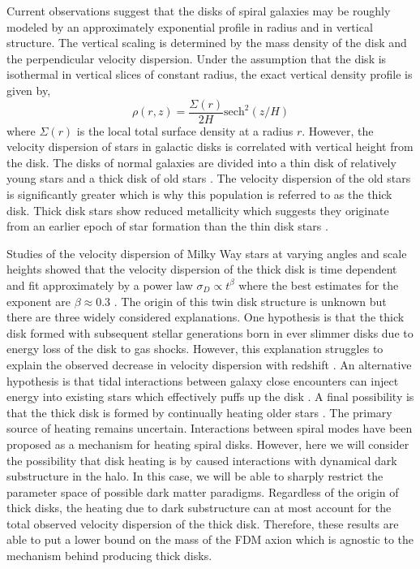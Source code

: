\documentclass[usenatbib]{mnras}
\begin{document}
\hspace{5mm} Current observations suggest that the disks of spiral galaxies may be roughly modeled by an approximately exponential profile in radius and in vertical structure. The vertical scaling is determined by the mass density of the disk and the perpendicular velocity dispersion. Under the assumption that the disk is isothermal in vertical slices of constant radius, the exact vertical density profile is given by,
\begin{equation}
\rho(r, z) =  \frac{\Sigma(r)}{2H} \mathrm{sech}^2{(z/H)} 
\end{equation} 
where $\Sigma(r)$ is the local total surface density at a radius $r$.
However, the velocity dispersion of stars in galactic disks is correlated with vertical height from the disk. The disks of normal galaxies are divided into a thin disk of relatively young stars and a thick disk of old stars \citep{binney_tremaine_2008}.  The velocity dispersion of the old stars is significantly greater which is why this population is referred to as the thick disk. Thick disk stars show reduced metallicity which suggests they originate from an earlier epoch of star formation than the thin disk stars \citep{binney_tremaine_2008}. 
\par
Studies of the velocity dispersion of Milky Way stars at varying angles and scale heights showed that the velocity dispersion of the thick disk is time dependent and fit approximately by a power law $\sigma_D \propto t^{\beta}$ where the best estimates for the exponent are $\beta \approx 0.3$ \citep{heating_history}. The origin of this twin disk structure is unknown but there are three widely considered explanations. One hypothesis is that the thick disk formed with subsequent stellar generations born in ever slimmer disks due to energy loss of the disk to gas shocks. However, this explanation struggles to explain the observed decrease in velocity dispersion with redshift \citep{emergence-thick-disk}. An alternative hypothesis is that tidal interactions between galaxy close encounters can inject energy into existing stars which effectively puffs up the disk \citep{thick-disk-mergers}. A final possibility is that the thick disk is formed by continually heating older stars \citep{thin-and-thick-disk}. The primary source of heating remains uncertain. Interactions between spiral modes have been proposed as a mechanism for heating spiral disks. However, here we will consider the possibility that disk heating is by caused interactions with dynamical dark substructure in the halo. In this case, we will be able to sharply restrict the parameter space of possible dark matter paradigms. Regardless of the origin of thick disks, the heating due to dark substructure can at most account for the total observed velocity dispersion of the thick disk. Therefore, these results are able to put a lower bound on the mass of the FDM axion which is agnostic to the mechanism behind producing thick disks.
\end{document}
